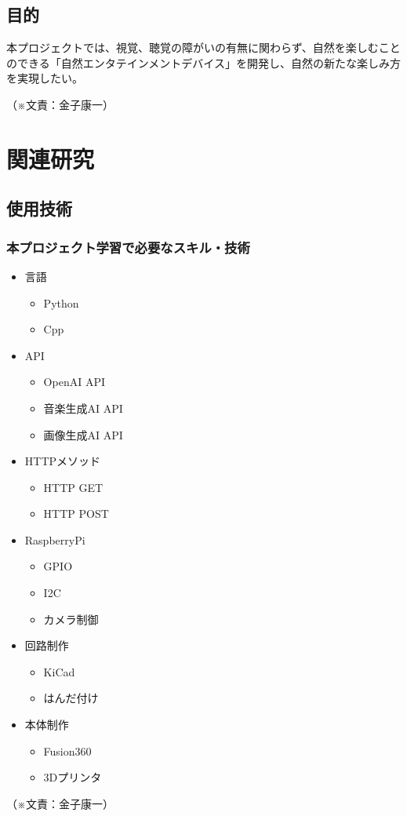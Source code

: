 \documentclass[12pt,a4paper]{report}
\newcommand{\Writer}[1]{
  \normalsize
  \begin{flushright}
    （※文責：#1）
  \end{flushright}
}
\begin{document}
\section{目的}
\label{goal}
\noindent\space
本プロジェクトでは、視覚、聴覚の障がいの有無に関わらず、自然を楽しむことのできる「自然エンタテインメントデバイス」を開発し、自然の新たな楽しみ方を実現したい。
\Writer{金子康一}

\chapter{関連研究}
\section{使用技術}
\subsection{本プロジェクト学習で必要なスキル・技術}
\noindent\space
\begin{itemize}
  \item 言語
  \begin{itemize}
    \item Python
    \item Cpp
  \end{itemize}
  \item API
  \begin{itemize}
    \item OpenAI API
    \item 音楽生成AI API
    \item 画像生成AI API
  \end{itemize}
  \item HTTPメソッド
  \begin{itemize}
    \item HTTP GET
    \item HTTP POST
  \end{itemize}
  \item RaspberryPi
  \begin{itemize}
    \item GPIO
    \item I2C
    \item カメラ制御
  \end{itemize}
  \item 回路制作
  \begin{itemize}
    \item KiCad
    \item はんだ付け
  \end{itemize}
  \item 本体制作
  \begin{itemize}
    \item Fusion360
    \item 3Dプリンタ
  \end{itemize}
\end{itemize}
\Writer{金子康一}
\end{document}
